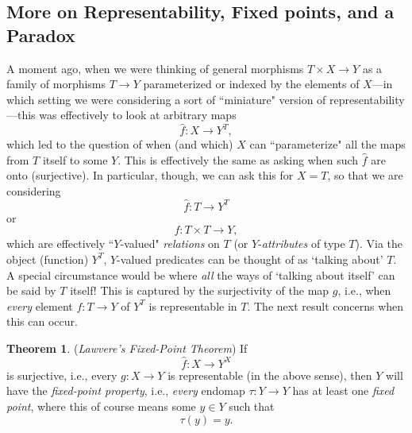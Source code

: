 \documentclass[a4paper]{book}
\theoremstyle{definition}
\theoremstyle{definition}
\theoremstyle{definition}
\newtheorem{theorem}{Theorem}[section]
\theoremstyle{theorem}
\theoremstyle{definition}
\begin{document}
\subsection{More on Representability, Fixed points, and a Paradox}
A moment ago, when we were thinking of general morphisms $T \times X \rightarrow Y$ as a family of morphisms $T \rightarrow Y$ parameterized or indexed by the elements of $X$---in which setting we were considering a sort of ``miniature" version of  representability---this was effectively to look at arbitrary maps
\begin{equation*}
\hat{f}: X \rightarrow Y^T,
\end{equation*}   
which led to the question of when (and which) $X$ can ``parameterize" all the maps from $T$ itself to some $Y$. This is effectively the same as asking when such $\hat{f}$ are onto (surjective). In particular, though, we can ask this for $X = T$, so that we are considering 
\begin{equation*}
\hat{f}: T \rightarrow Y^T
\end{equation*}   
or 
\begin{equation*}
f: T \times T \rightarrow Y,
\end{equation*}     
which are effectively ``$Y$-valued" \textit{relations} on $T$ (or $Y$-\textit{attributes} of type $T$).
Via the object (function) $Y^T$, $Y$-valued predicates can be thought of as `talking about' $T$. A special circumstance would be where \textit{all} the ways of `talking about itself' can be said by $T$ itself! This is captured by the surjectivity of the map $g$, i.e., when \textit{every} element $f: T \rightarrow Y$ of $Y^T$ is representable in $T$. The next result concerns when this can occur.   
\begin{theorem}
	(\textit{Lawvere's Fixed-Point Theorem})  If
	\begin{equation*}
	\hat{f}: X \rightarrow Y^X
	\end{equation*}
	is surjective, i.e., every $g: X \rightarrow Y$ is representable (in the above sense), then $Y$ will have the \textit{fixed-point property}, i.e., \textit{every} endomap $\tau: Y \rightarrow Y$ has at least one \textit{fixed point}, where this of course means some $y \in Y$ such that 
	\begin{equation*}
	\tau(y) = y. 
	\end{equation*} 
\end{theorem}
\end{document}
